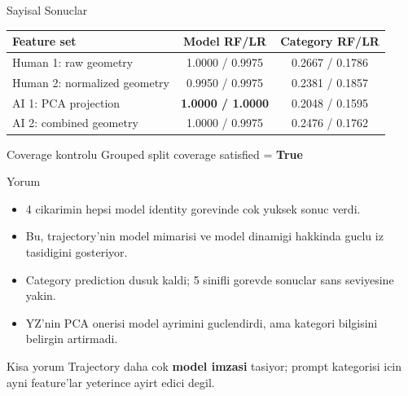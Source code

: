 \documentclass[aspectratio=169]{beamer}
\begin{document}
\begin{frame}{Sayisal Sonuclar}
  \scriptsize
  \begin{table}
    \centering
    \begin{tabular}{>{\raggedright\arraybackslash}p{4.0cm}cc}
      \toprule
      Feature set & Model RF/LR & Category RF/LR \\
      \midrule
      Human 1: raw geometry & 1.0000 / 0.9975 & 0.2667 / 0.1786 \\
      Human 2: normalized geometry & 0.9950 / 0.9975 & 0.2381 / 0.1857 \\
      AI 1: PCA projection & \textbf{1.0000 / 1.0000} & 0.2048 / 0.1595 \\
      AI 2: combined geometry & 1.0000 / 0.9975 & 0.2476 / 0.1762 \\
      \bottomrule
    \end{tabular}
  \end{table}

  \vspace{0.5em}
  \begin{block}{Coverage kontrolu}
    Grouped split coverage satisfied = \textbf{True}
  \end{block}
\end{frame}

\begin{frame}{Yorum}
  \begin{itemize}
    \item 4 cikarimin hepsi model identity gorevinde cok yuksek sonuc verdi.
    \item Bu, trajectory'nin model mimarisi ve model dinamigi hakkinda guclu iz tasidigini gosteriyor.
    \item Category prediction dusuk kaldi; 5 sinifli gorevde sonuclar sans seviyesine yakin.
    \item YZ'nin PCA onerisi model ayrimini guclendirdi, ama kategori bilgisini belirgin artirmadi.
  \end{itemize}

  \vspace{0.5em}
  \begin{block}{Kisa yorum}
    Trajectory daha cok \textbf{model imzasi} tasiyor; prompt kategorisi icin ayni feature'lar yeterince ayirt edici degil.
  \end{block}
\end{frame}
\end{document}
